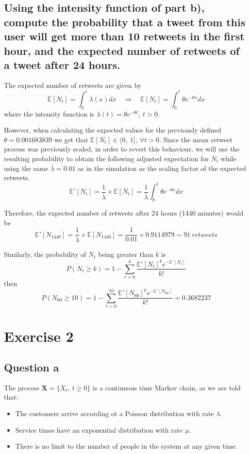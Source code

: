 \documentclass[11pt, a4paper]{article}
\begin{document}
\subsection{Using the intensity function of part b), compute the probability that a tweet from this user will get more than 10 retweets in the first hour, and the expected number of retweets of a tweet after 24 hours.}

The expected number of retweets are given by 
\[\mathbb{E}[N_t] = \int^t_0\lambda(x)dx \quad \Longrightarrow \quad \mathbb{E}[N_t] = \int^t_0 \theta e^{-\theta x} dx\]
where the intensity function is $ \lambda (t) = \theta e^{-\theta t},\ t>0$. 

However, when calculating the expected values for the previously defined $\theta = 0.001683839$ we get that $\mathbb{E}[N_t] \in (0,\ 1],\ \forall t>0$. Since the mean retweet process was previously scaled, in order to revert this behaviour, we will use the resulting probability to obtain the following adjusted expectation for $N_t$ while using the same $\overline\lambda = 0.01$ as in the simulation as the scaling factor of the expected retweets. 
\[\mathbb{E}'[N_t] = \frac{1}{\overline\lambda} \times \mathbb{E}[N_t] = \frac{1}{\overline\lambda}\int^t_0 \theta e^{-\theta x} dx\]

Therefore, the expected number of retweets after 24 hours (1440 minutes) would be
\[\mathbb{E}'[N_{1440}] = \frac{1}{\overline\lambda} \times \mathbb{E}[N_{1440}] = \frac{1}{0.01} \times 0.9114979 \sim 91\ retweets \] 

Similarly, the probability of $N_t$ being greater than $k$ is
\[P(N_{t} \geq k) = 1 - \sum_{t=0}^{k}\frac{\mathbb{E}'[N_{t}]^k e^{-\mathbb{E}'[N_{t}]}}{k!}\]
then
\[P(N_{60} \geq 10) = 1 - \sum_{t=0}^{10}\frac{\mathbb{E}'[N_{60}]^k e^{-\mathbb{E}'[N_{60}]}}{k!} = 0.3682237\]

\section{Exercise 2}
\subsection*{Question a}
The process $\bm{X} = \{X_t, \ t\geq 0\}$ is a continuous time Markov chain, as we are told that:
\begin{itemize}
	\item The customers arrive according ot a Poisson distribution with rate $\lambda$.
	\item Service times have an exponential distribution with rate $\mu$.
	\item There is no limit to the number of people in the system at any given time.
\end{itemize}
\end{document}
